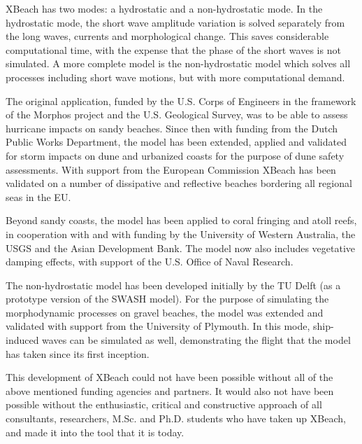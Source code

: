 \documentclass{article}
\begin{document}
\noindent 

\noindent XBeach has two modes: a hydrostatic and a non-hydrostatic mode. In the hydrostatic mode, the short wave amplitude variation is solved separately from the long waves, currents and morphological change. This saves considerable computational time, with the expense that the phase of the short waves is not simulated. A more complete model is the non-hydrostatic model which solves all processes including short wave motions, but with more computational demand.  

\noindent 

\noindent The original application, funded by the U.S. Corps of Engineers in the framework of the Morphos project and the U.S. Geological Survey, was to be able to assess hurricane impacts on sandy beaches. Since then with funding from the Dutch Public Works Department, the model has been extended, applied and validated for storm impacts on dune and urbanized coasts for the purpose of dune safety assessments. With support from the European Commission XBeach has been validated on a number of dissipative and reflective beaches bordering all regional seas in the EU. 

\noindent 

\noindent Beyond sandy coasts, the model has been applied to coral fringing and atoll reefs, in cooperation with and with funding by the University of Western Australia, the USGS and the Asian Development Bank. The model now also includes vegetative damping effects, with support of the U.S. Office of Naval Research.

\noindent 

\noindent The non-hydrostatic model has been developed initially by the TU Delft (as a prototype version of the SWASH model). For the purpose of simulating the morphodynamic processes on gravel beaches, the model was extended and validated with support from the University of Plymouth. In this mode, ship-induced waves can be simulated as well, demonstrating the flight that the model has taken since its first inception.

\noindent 

\noindent This development of XBeach could not have been possible without all of the above mentioned funding agencies and partners. It would also not have been possible without the enthusiastic, critical and constructive approach of all consultants, researchers, M.Sc. and Ph.D. students who have taken up XBeach, and made it into the tool that it is today.
\end{document}

